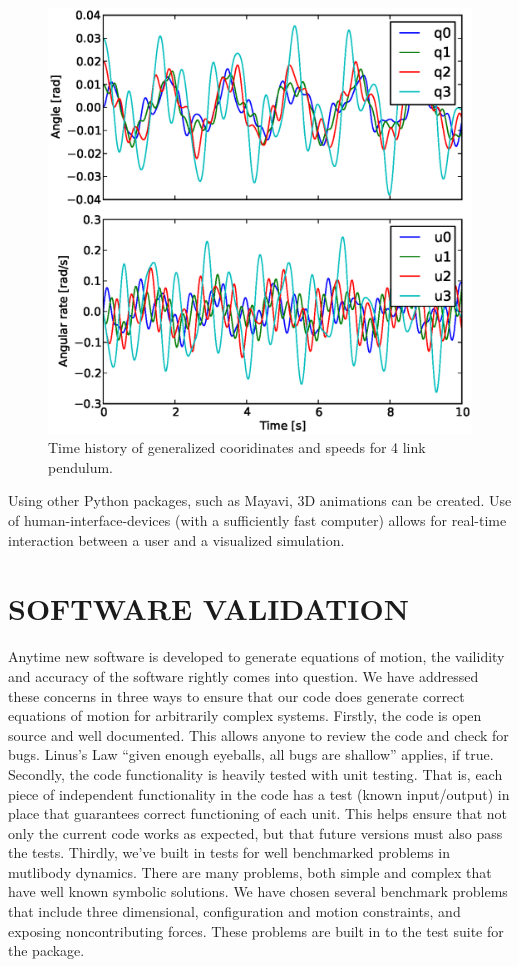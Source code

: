\documentclass[twocolumn,10pt]{asme2e}
\begin{document}
\begin{figure}
  \includegraphics[width=\columnwidth]{four_link_pendulum_time_series.eps}
  \caption{Time history of generalized cooridinates and speeds for 4 link
pendulum.}
  \label{fig:time_series}
\end{figure}

Using other Python packages, such as Mayavi, 3D animations can be created. Use
of human-interface-devices (with a sufficiently fast computer) allows for
real-time interaction between a user and a visualized simulation.

\section*{SOFTWARE VALIDATION}
Anytime new software is developed to generate equations of motion, the
vailidity and accuracy of the software rightly comes into question. We have
addressed these concerns in three ways to ensure that our code does generate
correct equations of motion for arbitrarily complex systems. Firstly, the code
is open source and well documented. This allows anyone to review the code and
check for bugs. Linus's Law ``given enough eyeballs, all bugs are shallow''
\cite{Raymond1999} applies, if true. Secondly, the code functionality is
heavily tested with unit testing. That is, each piece of independent
functionality in the code has a test (known input/output) in place that
guarantees correct functioning of each unit. This helps ensure that not only
the current code works as expected, but that future versions must also pass the
tests. Thirdly, we've built in tests for well benchmarked problems in mutlibody
dynamics. There are many problems, both simple and complex that have well known
symbolic solutions. We have chosen several benchmark problems that include
three dimensional, configuration and motion constraints, and exposing
noncontributing forces. These problems are built in to the test suite for the
package.
\end{document}

